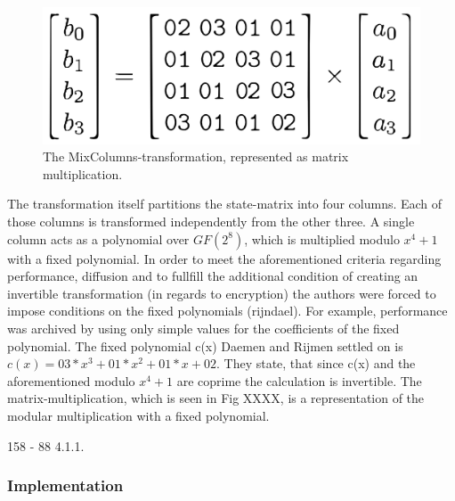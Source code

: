 \begin{figure}
\centering
\includegraphics[scale = 0.3]{data/figures/mixcolumn.png} 
\caption{The MixColumns-transformation, represented as matrix multiplication.}
\end{figure}

The transformation itself partitions the
state-matrix into four columns. Each of those columns is transformed
independently from the other three. A single column acts as a polynomial
over $GF(2^{8})$, which is multiplied modulo $x^4 + 1$ with a fixed polynomial. In
order to meet the aforementioned criteria regarding performance,
diffusion and to fullfill the additional condition of creating an
invertible transformation (in regards to encryption) the authors were
forced to impose conditions on the fixed polynomials (rijndael). For
example, performance was archived by using only simple values for the
coefficients of the fixed polynomial. The fixed polynomial c(x) Daemen
and Rijmen settled on is $c(x) = 03 * x^3 + 01 * x^2 + 01 * x + 02$. They
state, that since c(x) and the aforementioned modulo $x^4+1$ are coprime
the calculation is invertible. The matrix-multiplication, which is seen
in Fig XXXX, is a representation of the modular multiplication with a
fixed polynomial.

158 - 88 4.1.1. 

\hypertarget{implementation-4}{%
\subsubsection{Implementation}\label{implementation-4}}

